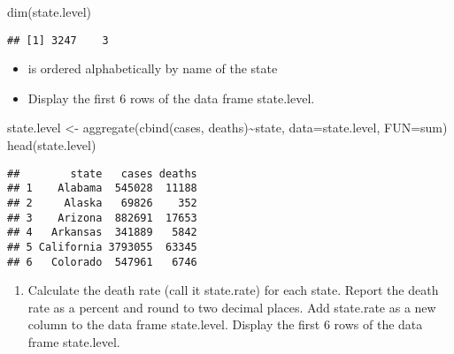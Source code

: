 \documentclass[
]{article}
\newenvironment{Shaded}{\begin{snugshade}}{\end{snugshade}}
\newcommand{\AttributeTok}[1]{\textcolor[rgb]{0.77,0.63,0.00}{#1}}
\newcommand{\DecValTok}[1]{\textcolor[rgb]{0.00,0.00,0.81}{#1}}
\newcommand{\FunctionTok}[1]{\textcolor[rgb]{0.00,0.00,0.00}{#1}}
\newcommand{\NormalTok}[1]{#1}
\newcommand{\OtherTok}[1]{\textcolor[rgb]{0.56,0.35,0.01}{#1}}
\newcommand{\SpecialCharTok}[1]{\textcolor[rgb]{0.00,0.00,0.00}{#1}}
\providecommand{\tightlist}{%
  \setlength{\itemsep}{0pt}\setlength{\parskip}{0pt}}
\begin{document}
\begin{Shaded}
\begin{Highlighting}[]
\FunctionTok{dim}\NormalTok{(state.level)}
\end{Highlighting}
\end{Shaded}

\begin{verbatim}
## [1] 3247    3
\end{verbatim}

\begin{itemize}
\tightlist
\item
  is ordered alphabetically by name of the state
\item
  Display the first 6 rows of the data frame state.level.
\end{itemize}

\begin{Shaded}
\begin{Highlighting}[]
\NormalTok{state.level }\OtherTok{\textless{}{-}} \FunctionTok{aggregate}\NormalTok{(}\FunctionTok{cbind}\NormalTok{(cases, deaths)}\SpecialCharTok{\textasciitilde{}}\NormalTok{state, }\AttributeTok{data=}\NormalTok{state.level, }\AttributeTok{FUN=}\NormalTok{sum)}
\FunctionTok{head}\NormalTok{(state.level)}
\end{Highlighting}
\end{Shaded}

\begin{verbatim}
##        state   cases deaths
## 1    Alabama  545028  11188
## 2     Alaska   69826    352
## 3    Arizona  882691  17653
## 4   Arkansas  341889   5842
## 5 California 3793055  63345
## 6   Colorado  547961   6746
\end{verbatim}

\begin{enumerate}
\def\labelenumi{\alph{enumi}.}
\setcounter{enumi}{1}
\tightlist
\item
  Calculate the death rate (call it state.rate) for each state. Report
  the death rate as a percent and round to two decimal places. Add
  state.rate as a new column to the data frame state.level. Display the
  first 6 rows of the data frame state.level.
\end{enumerate}

\begin{Shaded}
\end{Shaded}
\end{document}
